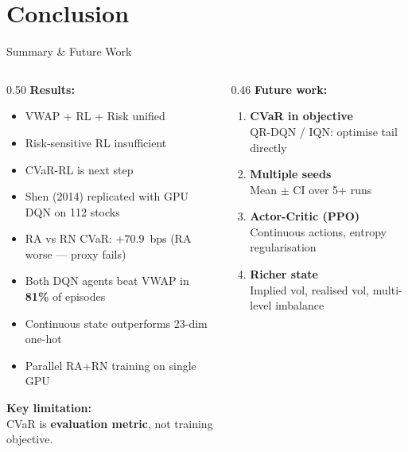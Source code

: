 \documentclass[aspectratio=169, 10pt]{beamer}
\begin{document}
\section{Conclusion}

\begin{frame}{Summary \& Future Work}
  \begin{columns}[T]
    \begin{column}{0.50\textwidth}
      \textbf{Results:}
      \begin{itemize}
            \item[\checkmark] VWAP + RL + Risk unified
            \item[\checkmark] Risk-sensitive RL insufficient
            \item[\checkmark] CVaR-RL is next step
            \item[\checkmark] Shen (2014) replicated with GPU DQN on 112 stocks
             \item[\checkmark] RA vs RN CVaR: $\mathbf{+70.9}$~bps (RA worse — proxy fails)
            \item[\checkmark] Both DQN agents beat VWAP in \textbf{81\%} of episodes
            \item[\checkmark] Continuous state outperforms 23-dim one-hot
             \item[\checkmark] Parallel RA+RN training on single GPU
      \end{itemize}

      \bigskip
      \textbf{Key limitation:}\\
      CVaR is \textbf{evaluation metric}, not training objective.
    \end{column}
    \begin{column}{0.46\textwidth}
      \textbf{Future work:}
      \begin{enumerate}
        \item \textbf{CVaR in objective}\\
          \small QR-DQN / IQN: optimise tail directly
        \normalsize\item \textbf{Multiple seeds}\\
          \small Mean $\pm$ CI over 5+ runs
        \normalsize\item \textbf{Actor-Critic (PPO)}\\
          \small Continuous actions, entropy regularisation
        \normalsize\item \textbf{Richer state}\\
          \small Implied vol, realised vol, multi-level imbalance
      \end{enumerate}


\end{column}
\end{columns}
\end{frame}
\end{document}
